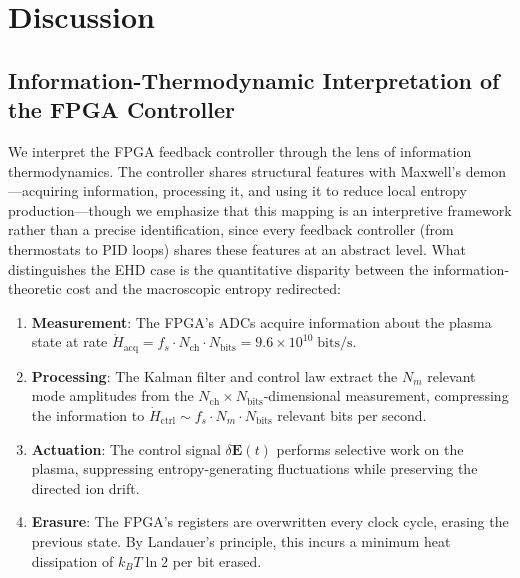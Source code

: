 \documentclass[12pt,twocolumn]{article}
\newcommand{\ee}{\mathbf{E}}
\begin{document}
\section{Discussion}
\label{sec:discussion}

\subsection{Information-Thermodynamic Interpretation of the FPGA
  Controller}
\label{sec:discussion:demon}

We interpret the FPGA feedback controller through the lens of
information thermodynamics. The controller shares structural
features with Maxwell's demon---acquiring information, processing it,
and using it to reduce local entropy production---though we emphasize
that this mapping is an interpretive framework rather than a precise
identification, since every feedback controller (from thermostats to
PID loops) shares these features at an abstract level. What
distinguishes the EHD case is the quantitative disparity between the
information-theoretic cost and the macroscopic entropy redirected:

\begin{enumerate}
  \item \textbf{Measurement}: The FPGA's ADCs acquire information
    about the plasma state at rate
    $\dot{H}_{\mathrm{acq}} = f_s \cdot N_{\mathrm{ch}} \cdot
    N_{\mathrm{bits}} = 9.6 \times 10^{10}\;\mathrm{bits/s}$.

  \item \textbf{Processing}: The Kalman filter and control law
    extract the $N_m$ relevant mode amplitudes from the
    $N_{\mathrm{ch}} \times N_{\mathrm{bits}}$-dimensional
    measurement, compressing the information to
    $\dot{H}_{\mathrm{ctrl}} \sim f_s \cdot N_m \cdot
    N_{\mathrm{bits}}$ relevant bits per second.

  \item \textbf{Actuation}: The control signal $\delta\ee(t)$
    performs selective work on the plasma, suppressing
    entropy-generating fluctuations while preserving the directed
    ion drift.

  \item \textbf{Erasure}: The FPGA's registers are overwritten
    every clock cycle, erasing the previous state. By Landauer's
    principle, this incurs a minimum heat dissipation of
    $k_B T \ln 2$ per bit erased.
\end{enumerate}
\end{document}
